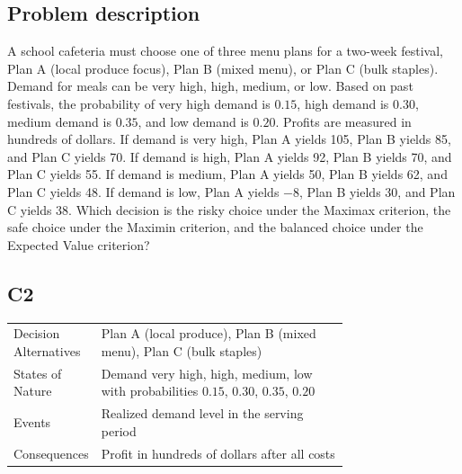 

	
	\begin{ExamProblems}
		\item
		\subsection*{Problem description}
		A school cafeteria must choose one of three menu plans for a two-week festival, Plan A (local produce focus),
		Plan B (mixed menu), or Plan C (bulk staples). Demand for meals can be very high, high, medium, or low. Based on past festivals, the probability of very high demand is $0.15$, high demand is $0.30$, medium demand is $0.35$, and low demand is $0.20$. Profits are measured in hundreds of dollars. If demand is very high, Plan A yields 105, Plan B yields 85, and Plan C yields 70. If demand is high, Plan A yields 92, Plan B yields 70, and Plan C yields 55. If demand is medium, Plan A yields 50, Plan B yields 62, and Plan C yields 48. If demand is low, Plan A yields $-8$, Plan B yields 30, and Plan C yields 38. Which decision is the risky choice under the Maximax criterion, the safe choice under the Maximin criterion, and the balanced choice under the Expected Value criterion?

		\subsection*{C2}
		\begin{center}
			\begin{tabular}{l p{0.74\linewidth}}
				\toprule
				Decision Alternatives & Plan A (local produce), Plan B (mixed menu), Plan C (bulk staples) \\
				States of Nature & Demand very high, high, medium, low with probabilities $0.15$, $0.30$, $0.35$, $0.20$ \\
				Events & Realized demand level in the serving period \\
				Consequences & Profit in hundreds of dollars after all costs \\
				\bottomrule
			\end{tabular}
		\end{center}


\end{ExamProblems}
